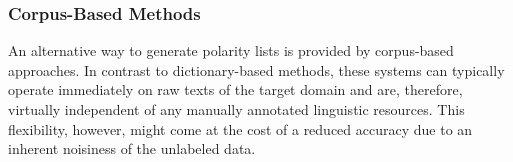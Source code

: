 





\subsubsection{Corpus-Based Methods}

An alternative way to generate polarity lists is provided by
corpus-based approaches.  In contrast to dictionary-based methods,
these systems can typically operate immediately on raw texts of the
target domain and are, therefore, virtually independent of any
manually annotated linguistic resources.  This flexibility, however,
might come at the cost of a reduced accuracy due to an inherent
noisiness of the unlabeled data.

